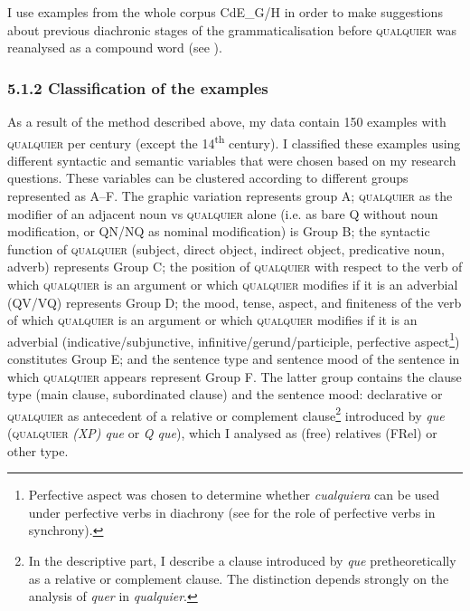 \documentclass[output=paper]{langscibook}
\begin{document}
I use examples from the whole corpus CdE\_G/H in order to make suggestions about previous diachronic stages of the grammaticalisation before \textsc{qualquier} was reanalysed as a compound word (see ). 

\subsubsection{\textbf{5.1.2} \textbf{Classification} \textbf{of} \textbf{the} \textbf{examples}}

As a result of the method described above, my data contain 150 examples with \textsc{qualquier} per century (except the 14\textsuperscript{th} century). I classified these examples using different syntactic and semantic variables that were chosen based on my research questions. These variables can be clustered according to different groups represented as A–F. The graphic variation represents group A; \textsc{qualquier} as the modifier of an adjacent noun vs \textsc{qualquier} alone (i.e. as bare Q without noun modification, or QN/NQ as nominal modification) is Group B; the syntactic function of \textsc{qualquier} (subject, direct object, indirect object, predicative noun, adverb) represents Group C; the position of \textsc{qualquier} with respect to the verb of which \textsc{qualquier} is an argument or which \textsc{qualquier} modifies if it is an adverbial (QV/VQ) represents Group D; the mood, tense, aspect, and finiteness of the verb of which \textsc{qualquier} is an argument or which \textsc{qualquier} modifies if it is an adverbial (indicative/subjunctive, infinitive/gerund/participle, perfective aspect\footnote{ \textrm{Perfective aspect was chosen to determine whether} \textrm{\textit{cualquiera}} \textrm{can be used under perfective verbs in diachrony (see  for the role of perfective verbs in synchrony).}}) constitutes Group E; and the sentence type and sentence mood of the sentence in which \textsc{qualquier} appears represent Group F. The latter group contains the clause type (main clause, subordinated clause) and the sentence mood: declarative or \textsc{qualquier} as antecedent of a relative or complement clause\footnote{\textrm{In the descriptive part, I describe a clause introduced by} \textrm{\textit{que}} \textrm{pretheoretically as a relative or complement clause. The distinction depends strongly on the analysis of} \textrm{\textit{quer}} \textrm{in} \textrm{\textit{qualquier}}.} introduced by \textit{que} (\textsc{qualquier} \textit{(XP) que} or \textit{Q que}), which I analysed as (free) relatives (FRel) or other type.
\end{document}
